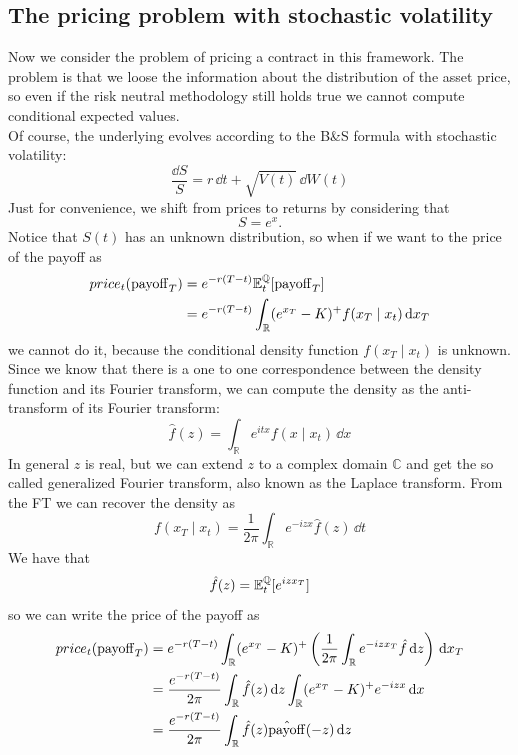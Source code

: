 \subsection{The pricing problem with stochastic volatility}
Now we consider the problem of pricing a contract in this framework. The problem is that we loose the information about the distribution of the asset price, so even if the risk neutral methodology still holds true we cannot compute conditional expected values.\\
Of course, the underlying evolves according to the B\&S formula with stochastic volatility:
\begin{equation}
    \frac{\dd S}{S} = r\,\dd t + \sqrt{V(t)}\,\dd W(t)
\end{equation}
Just for convenience, we shift from prices to returns by considering that
\begin{equation*}
    S = e^x.
\end{equation*}
Notice that $S(t)$ has an unknown distribution, so when if we want to the price of the payoff as
\begin{align*}
    price_t(\operatorname{payoff}_T) &= e^{-r(T-t)}\mathbb{E}^{\mathbb{Q}}_t[\operatorname{payoff}_T] \\
    &=
    e^{-r(T-t)}\int_{\mathbb{R}}(e^{x_T}-K)^+ f(x_T \mid x_t)\,\dd x_T
\end{align*}
we cannot do it, because the conditional density function $f(x_T\mid x_t)$ is unknown. Since we know that there is a one to one correspondence between the density function and its Fourier transform, we can compute the density as the anti-transform of its Fourier transform:
\begin{equation*}
    \hat{f}(z) = \int_{\mathbb{R}}e^{itx}f(x\mid x_t)\,\dd x
\end{equation*}
In general $z$ is real, but we can extend $z$ to a complex domain $\mathbb{C}$ and get the so called generalized Fourier transform, also known as the Laplace transform. From the FT we can recover the density as
\begin{equation*}
    f(x_T\mid x_t) = \frac{1}{2\pi}\int_{\mathbb{R}}e^{-izx}\hat{f}(z)\,\dd t
\end{equation*}
We have that
\begin{equation*}
    \hat{f}(z) = \mathbb{E}^{\mathbb{Q}}_t[e^{izx_T}]
\end{equation*}
so we can write the price of the payoff as
\begin{align*}
    price_t(\operatorname{payoff}_T) &= e^{-r(T-t)}\int_{\mathbb{R}}(e^{x_T}-K)^+ \left(\frac{1}{2\pi}\int_{\mathbb{R}}e^{-izx_T}\hat{f}\,\dd z\right)\,\dd x_T \\
    &=
    \frac{e^{-r(T-t)}}{2\pi}\int_{\mathbb{R}}\hat{f}(z)\,\dd z \int_{\mathbb{R}}(e^{x_T}-K)^+e^{-izx}\,\dd x \\
    &=
    \frac{e^{-r(T-t)}}{2\pi}\int_{\mathbb{R}}\hat{f}(z)\hat{\operatorname{payoff}}(-z)\,\dd z
\end{align*}
